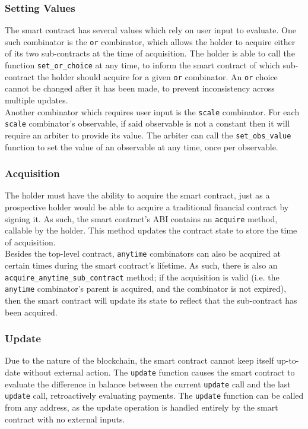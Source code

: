\subsubsection{Setting Values}

The smart contract has several values which rely on user input to evaluate. One such combinator is the \texttt{or} combinator, which allows the holder to acquire either of its two sub-contracts at the time of acquisition. The holder is able to call the function \texttt{set\_or\_choice} at any time, to inform the smart contract of which sub-contract the holder should acquire for a given \texttt{or} combinator. An \texttt{or} choice cannot be changed after it has been made, to prevent inconsistency across multiple updates. \\

Another combinator which requires user input is the \texttt{scale} combinator. For each \texttt{scale} combinator's observable, if said observable is not a constant then it will require an arbiter to provide its value. The arbiter can call the \texttt{set\_obs\_value} function to set the value of an observable at any time, once per observable.

\subsubsection{Acquisition}

The holder must have the ability to acquire the smart contract, just as a prospective holder would be able to acquire a traditional financial contract by signing it. As such, the smart contract's ABI contains an \texttt{acquire} method, callable by the holder. This method updates the contract state to store the time of acquisition. \\

Besides the top-level contract, \texttt{anytime} combinators can also be acquired at certain times during the smart contract's lifetime. As such, there is also an \texttt{acquire\_anytime\_sub\_contract} method; if the acquisition is valid (i.e. the \texttt{anytime} combinator's parent is acquired, and the combinator is not expired), then the smart contract will update its state to reflect that the sub-contract has been acquired.

\subsubsection{Update}

Due to the nature of the blockchain, the smart contract cannot keep itself up-to-date without external action. The \texttt{update} function causes the smart contract to evaluate the difference in balance between the current \texttt{update} call and the last \texttt{update} call, retroactively evaluating payments. The \texttt{update} function can be called from any address, as the update operation is handled entirely by the smart contract with no external inputs.

